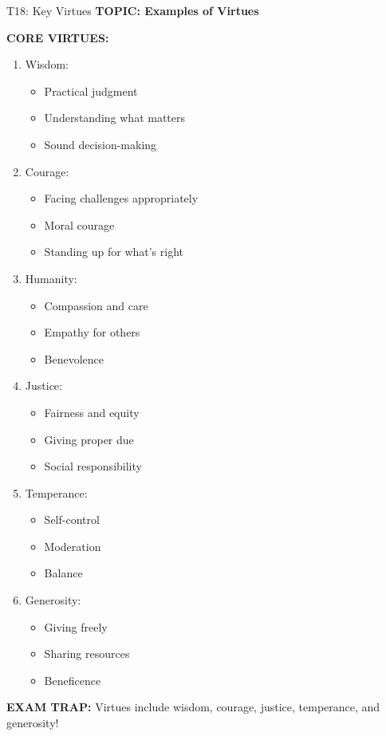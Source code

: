 \documentclass[8pt]{beamer}
\begin{document}
	\begin{frame}{T18: Key Virtues}
		\fontsize{6.5}{7.5}\selectfont
		\textbf{TOPIC: Examples of Virtues}
		
		\vspace{0.1cm}
		\textbf{CORE VIRTUES:}
		\begin{enumerate}
			\item \textcolor{myblue}{Wisdom:}
			\begin{itemize}
				\item Practical judgment
				\item Understanding what matters
				\item Sound decision-making
			\end{itemize}
			\item \textcolor{myblue}{Courage:}
			\begin{itemize}
				\item Facing challenges appropriately
				\item Moral courage
				\item Standing up for what's right
			\end{itemize}
			\item \textcolor{myblue}{Humanity:}
			\begin{itemize}
				\item Compassion and care
				\item Empathy for others
				\item Benevolence
			\end{itemize}
			\item \textcolor{myblue}{Justice:}
			\begin{itemize}
				\item Fairness and equity
				\item Giving proper due
				\item Social responsibility
			\end{itemize}
			\item \textcolor{myblue}{Temperance:}
			\begin{itemize}
				\item Self-control
				\item Moderation
				\item Balance
			\end{itemize}
			\item \textcolor{myblue}{Generosity:}
			\begin{itemize}
				\item Giving freely
				\item Sharing resources
				\item Beneficence
			\end{itemize}
		\end{enumerate}
		
		\textcolor{myred}{\textbf{EXAM TRAP:}} Virtues include \textcolor{myblue}{wisdom, courage, justice, temperance, and generosity}!
	\end{frame}
	
\end{document}
